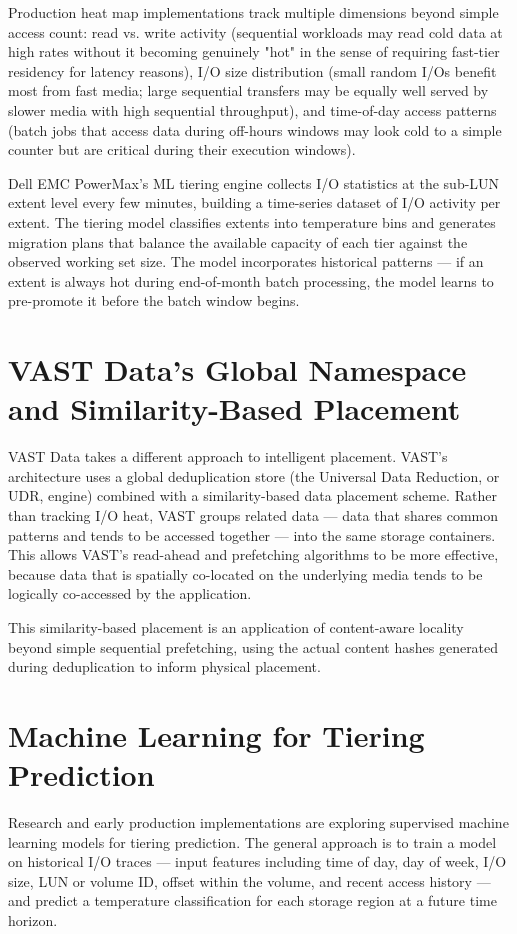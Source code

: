 Production heat map implementations track multiple dimensions beyond simple access count: read vs. write activity (sequential workloads may read cold data at high rates without it becoming genuinely "hot" in the sense of requiring fast-tier residency for latency reasons), I/O size distribution (small random I/Os benefit most from fast media; large sequential transfers may be equally well served by slower media with high sequential throughput), and time-of-day access patterns (batch jobs that access data during off-hours windows may look cold to a simple counter but are critical during their execution windows).

Dell EMC PowerMax's ML tiering engine collects I/O statistics at the sub-LUN extent level every few minutes, building a time-series dataset of I/O activity per extent. The tiering model classifies extents into temperature bins and generates migration plans that balance the available capacity of each tier against the observed working set size. The model incorporates historical patterns --- if an extent is always hot during end-of-month batch processing, the model learns to pre-promote it before the batch window begins.

\section{VAST Data's Global Namespace and Similarity-Based Placement}
VAST Data takes a different approach to intelligent placement. VAST's architecture uses a global deduplication store (the Universal Data Reduction, or UDR, engine) combined with a similarity-based data placement scheme. Rather than tracking I/O heat, VAST groups related data --- data that shares common patterns and tends to be accessed together --- into the same storage containers. This allows VAST's read-ahead and prefetching algorithms to be more effective, because data that is spatially co-located on the underlying media tends to be logically co-accessed by the application.

This similarity-based placement is an application of content-aware locality beyond simple sequential prefetching, using the actual content hashes generated during deduplication to inform physical placement.

\section{Machine Learning for Tiering Prediction}
Research and early production implementations are exploring supervised machine learning models for tiering prediction. The general approach is to train a model on historical I/O traces --- input features including time of day, day of week, I/O size, LUN or volume ID, offset within the volume, and recent access history --- and predict a temperature classification for each storage region at a future time horizon.


